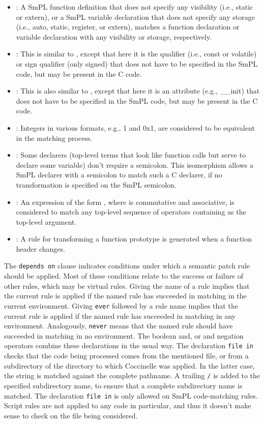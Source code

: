 \begin{itemize}
\item {}: A SmPL function definition that does not
  specify any visibility (i.e., static or extern), or a SmPL variable
  declaration that does not specify any storage (i.e., auto, static,
  register, or extern), matches a function declaration or variable
  declaration with any visibility or storage, respectively.
\item {}: This is similar to ,
  except that here it is the qualifier (i.e., const or volatile) or
  sign qualifier (only signed) that does
  not have to be specified in the SmPL code, but may be present in the C code.
\item {}: This is also similar to
  , except that here it is an attribute (e.g.,
  \_\_init) that does not have to be specified in the SmPL code, but may be
  present in the C code.
\item {}: Integers in various formats, e.g., 1 and 0x1, are
  considered to be equivalent in the matching process.
\item {}: Some declarers (top-level terms
  that look like function calls but serve to declare some variable) don't
  require a semicolon.  This isomorphism allows a SmPL declarer with a semicolon
  to match such a C declarer, if no transformation is specified on the SmPL
  semicolon.
\item {}: An expression of the form  
  , where  is commutative and associative, is
  considered to match any top-level sequence of  operators
  containing  as the top-level argument.
\item {}: A rule for transforming a function prototype is
  generated when a function header changes.
\end{itemize}

The \texttt{depends on} clause indicates conditions under which a semantic
patch rule should be applied.  Most of these conditions relate to the
success or failure of other rules, which may be virtual rules.  Giving the
name of a rule implies that the current rule is applied if the named rule
has succeeded in matching in the current environment.  Giving \texttt{ever}
followed by a rule name implies that the current rule is applied if the
named rule has succeeded in matching in any environment.  Analogously,
\texttt{never} means that the named rule should have succeeded in matching
in no environment.  The boolean and, or and negation operators combine
these declarations in the usual way.  The declaration {\tt file in} checks
that the code being processed comes from the mentioned file, or from a
subdirectory of the directory to which Coccinelle was applied.  In the
latter case, the string is matched against the complete pathname.  A
trailing {\tt /} is added to the specified subdirectory name, to ensure
that a complete subdirectory name is matched.  The
declaration {\tt file in} is only allowed on SmPL code-matching rules.
Script rules are not applied to any code in particular, and thus it doesn't
make sense to check on the file being considered.


